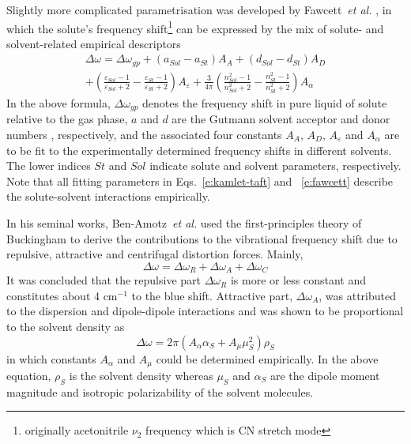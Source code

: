 \documentclass[b5paper,oneside,fleqn,11pt]{book}
\begin{document}
\begin{refsection}
Slightly more complicated parametrisation was developed 
by Fawcett~\emph{et al.} \citep{Reimers.Hall.JACS.1999,Fawcett.Liu.Kessler.JPC.1993,Fawcett.Kloss.JCP.1996},
in which the solute's frequency shift\footnote{originally acetonitrile $\nu_2$ frequency
which is CN stretch mode} can be expressed by the mix of solute- and
solvent-related empirical descriptors
%
\begin{multline} \label{e:fawcett}
\Delta \omega = \Delta \omega_{gp} + 
\left( a_{Sol} - a_{St} \right) A_A +
\left( d_{Sol} - d_{St} \right) A_D \\ + 
\left( \frac{\varepsilon_{Sol}-1}{\varepsilon_{Sol}+2} - \frac{\varepsilon_{St}-1}{\varepsilon_{St}+2} \right) A_\varepsilon +
\frac{3}{4\pi}
\left( \frac{n^2_{Sol}-1}{n^2_{Sol}+2} - \frac{n^2_{St}-1}{n^2_{St}+2} \right) A_\alpha
\end{multline}
%
In the above formula, $\Delta \omega_{gp}$ denotes the frequency shift in pure liquid of solute
relative to the gas phase,
$a$ and $d$ are the Gutmann solvent acceptor and donor numbers \citep{Gutmann.Resch.Linert.CoordChemRev.1982}, 
respectively,
and the associated four constants $A_A$, $A_D$, $A_\varepsilon$ and $A_\alpha$ 
are to be fit to the experimentally determined frequency shifts in different solvents.
The lower indices $St$ and $Sol$ indicate solute and solvent parameters, respectively. 
Note that all fitting parameters in Eqs.~\eqref{e:kamlet-taft} and ~\eqref{e:fawcett} 
describe the solute\hyp{}solvent interactions empirically.

In his seminal works, Ben\hyp{}Amotz~\emph{et al.} \citep{Ben-Amotz.Lee.Cho.List.JCP.1992} 
used the first\hyp{}principles theory of Buckingham \citep{Buckingham.ProcRSocLondonA.1958,
Buckingham.ProcRSocLondonA.1960,Buckingham.TransFaradaySoc.1960}
to derive the contributions to the vibrational frequency shift due to
repulsive, attractive and centrifugal distortion forces. Mainly,
%
\begin{equation} \label{e:ben-amotz}
 \Delta \omega = \Delta \omega_R + \Delta \omega_A + \Delta \omega_C
\end{equation}
%
It was concluded that the repulsive part $\Delta \omega_R$ is more or less constant
and constitutes about 4 cm$^{-1}$ to the blue shift. Attractive part, $\Delta \omega_A$,
was attributed to the dispersion and dipole\hyp{}dipole interactions
and was shown to be proportional to the solvent density as
%
\begin{equation} \label{e:ben-amotz-ro}
 \Delta \omega = 2\pi\left( A_\alpha \alpha_S + A_\mu \mu_S^2 \right) \rho_S
\end{equation}
%
in which constants $A_\alpha$ and $A_\mu$ could be determined empirically. 
In the above equation, $\rho_S$ is the solvent density whereas $\mu_S$ and $\alpha_S$ are the
dipole moment magnitude and isotropic polarizability of the solvent molecules.


\end{refsection}
\end{document}

